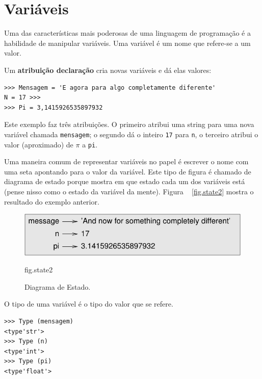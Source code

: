 \documentclass[10pt]{book}
\begin{document}
\section{Variáveis}
\label{variáveis}

Uma das características mais poderosas de uma linguagem de programação é a
habilidade de manipular variáveis ​​{\bf}. Uma variável é um nome que
refere-se a um valor.

Um {\bf atribuição declaração} cria novas variáveis ​​e dá
elas valores:

\begin{verbatim}
>>> Mensagem = 'E agora para algo completamente diferente'
N = 17 >>>
>>> Pi = 3,1415926535897932
\end{verbatim}
%
Este exemplo faz três atribuições. O primeiro atribui uma string
para uma nova variável chamada {\tt mensagem};
o segundo dá o inteiro {\tt 17} para {\tt n}, o terceiro
atribui o valor (aproximado) de $ \pi $ a {\tt pi}.

Uma maneira comum de representar variáveis ​​no papel é escrever o nome com
uma seta apontando para o valor da variável. Este tipo de figura é
chamado de diagrama de estado {\bf} porque mostra em que estado cada um dos
variáveis ​​está (pense nisso como o estado da variável da mente).
Figura ~ \ref {fig.state2} mostra o resultado do exemplo anterior.

\begin{figure}
\centerline
{\includegraphics[scale = 0.8] {figs/state2.pdf}}
\caption{Diagrama de Estado.}
\label{} fig.state2
\end{figure}

O tipo de uma variável é o tipo do valor que se refere.

\begin{verbatim}
>>> Type (mensagem)
<type'str'>
>>> Type (n)
<type'int'>
>>> Type (pi)
<type'float'>
\end{verbatim}
\end{document}
